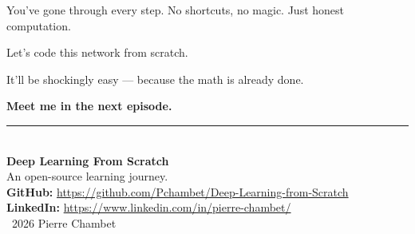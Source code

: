 \documentclass[11pt]{article}
\begin{document}
You’ve gone through every step. No shortcuts, no magic. Just honest computation.

\begin{actionbox}[title=Next Stop --- Practice]
Let’s code this network from scratch.

It’ll be shockingly easy --- because the math is already done.

\textbf{Meet me in the next episode.}
\end{actionbox}

\vspace{2em}
\begin{center}
\rule{0.6\textwidth}{0.4pt}\\[1em]
{\small \textbf{Deep Learning From Scratch}}\\[0.3em]
{\small An open-source learning journey.}\\[0.8em]
{\small \textbf{GitHub:} \url{https://github.com/Pchambet/Deep-Learning-from-Scratch}}\\[0.3em]
{\small \textbf{LinkedIn:} \url{https://www.linkedin.com/in/pierre-chambet/}}\\[1em]
{\footnotesize \textcopyright\ 2026 Pierre Chambet}
\end{center}
\end{document}
